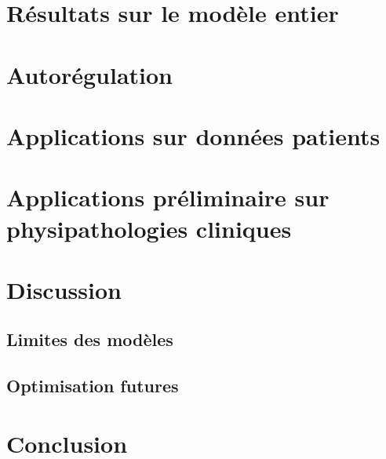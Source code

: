 \documentclass{report}
\begin{document}
\section{Résultats sur le modèle entier}

\section{Autorégulation}

\section{Applications sur données patients}

\section{Applications préliminaire sur physipathologies cliniques}

\section{Discussion}
\subsection{Limites des modèles}
\subsection{Optimisation futures}

\section{Conclusion}


\end{document}
